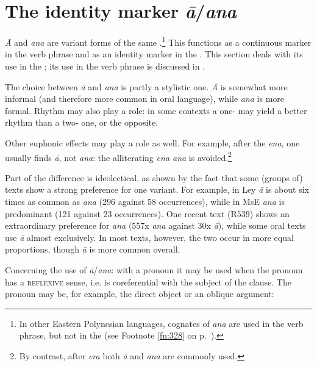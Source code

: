 \section{The identity marker \textit{{\ꞌ}ā}/\textit{{\ꞌ}ana}}\label{sec:5.9}
\textit{{\ꞌ}Ā} and \textit{{\ꞌ}ana} are variant forms of the same .\footnote{\label{fn:274}In other Eastern Polynesian languages, cognates of \textit{{\ꞌ}ana} are used in the verb phrase, but not in the  (see Footnote \ref{fn:328} on p.~\pageref{fn:328}).} This  functions as a continuous marker in the verb phrase and as an identity marker in the . This section deals with its use in the ; its use in the verb phrase is discussed in .

The choice between \textit{{\ꞌ}ā} and \textit{{\ꞌ}ana} is partly a stylistic one. \textit{{\ꞌ}Ā} is somewhat more informal (and therefore more common in oral language), while \textit{{\ꞌ}ana} is more formal. Rhythm may also play a role: in some contexts a one-  may yield a better rhythm than a two- one, or the opposite. 

Other euphonic effects may play a role as well. For example, after the  \textit{ena}, one usually finds \textit{{\ꞌ}ā}, not \textit{{\ꞌ}ana}: the alliterating \textit{ena {\ꞌ}ana} is avoided.\footnote{\label{fn:275}By contrast, after \textit{era} both \textit{{\ꞌ}ā} and \textit{{\ꞌ}ana} are commonly used.}

Part of the difference is ideolectical, as shown by the fact that some (groups of) texts show a strong preference for one variant. For example, in Ley \textit{{\ꞌ}ā} is about six times as common as \textit{{\ꞌ}ana} (296 against 58 occurrences), while in MsE \textit{{\ꞌ}ana} is predominant (121 against 23 occurrences). One recent text (R539) shows an extraordinary preference for \textit{{\ꞌ}ana} (557x \textit{{\ꞌ}ana} against 30x \textit{{\ꞌ}ā}), while some oral texts use \textit{{\ꞌ}ā} almost exclusively. In most texts, however, the two occur in more equal proportions, though \textit{{\ꞌ}ā} is more common overall.

Concerning the use of \textit{{\ꞌ}ā}/\textit{{\ꞌ}ana}: with a pronoun it may be used when the pronoun has a \textsc{reflexive} sense, i.e. is coreferential with the subject of the clause. The pronoun may be, for example, the direct object or an oblique argument:

